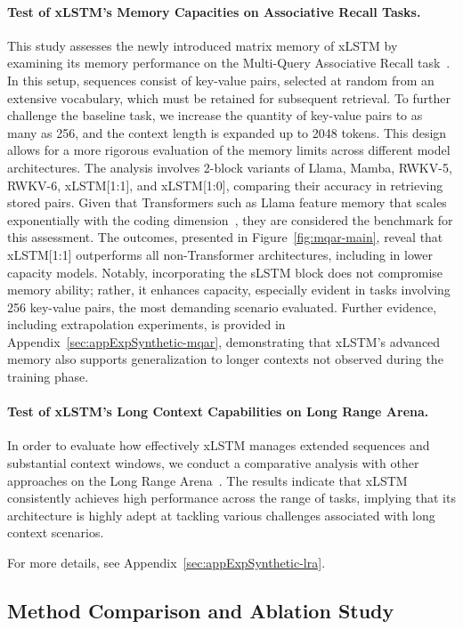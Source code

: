 \paragraph{Test of xLSTM's Memory Capacities on Associative Recall Tasks.} This study assesses the newly introduced matrix memory of xLSTM by examining its memory performance on the Multi-Query Associative Recall task~\citep{Arora:23arxiv}. In this setup, sequences consist of key-value pairs, selected at random from an extensive vocabulary, which must be retained for subsequent retrieval. To further challenge the baseline task, we increase the quantity of key-value pairs to as many as 256, and the context length is expanded up to 2048 tokens. This design allows for a more rigorous evaluation of the memory limits across different model architectures. The analysis involves 2-block variants of Llama, Mamba, RWKV-5, RWKV-6, xLSTM[1:1], and xLSTM[1:0], comparing their accuracy in retrieving stored pairs. Given that Transformers such as Llama feature memory that scales exponentially with the coding dimension~\citep{Ramsauer:21}, they are considered the benchmark for this assessment. The outcomes, presented in Figure~\ref{fig:mqar-main}, reveal that xLSTM[1:1] outperforms all non-Transformer architectures, including in lower capacity models. Notably, incorporating the sLSTM block does not compromise memory ability; rather, it enhances capacity, especially evident in tasks involving 256 key-value pairs, the most demanding scenario evaluated. Further evidence, including extrapolation experiments, is provided in Appendix~\ref{sec:appExpSynthetic-mqar}, demonstrating that xLSTM's advanced memory also supports generalization to longer contexts not observed during the training phase.

\paragraph{Test of xLSTM's Long Context Capabilities on Long Range Arena.} In order to evaluate how effectively xLSTM manages extended sequences and substantial context windows, we conduct a comparative analysis with other approaches on the Long Range Arena~\citep{Tay:21}. The results indicate that xLSTM consistently achieves high performance across the range of tasks, implying that its architecture is highly adept at tackling various challenges associated with long context scenarios.

For more details, see Appendix~\ref{sec:appExpSynthetic-lra}.

\subsection{Method Comparison and Ablation Study}
\label{sec:ExpComparison}

